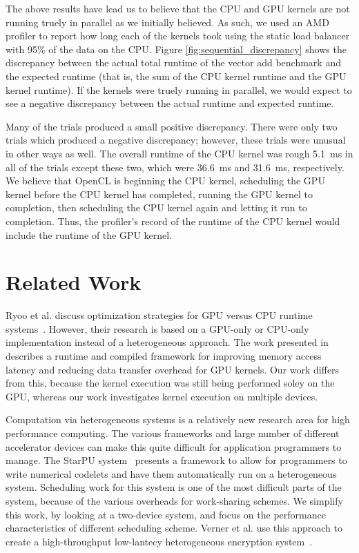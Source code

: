\documentclass[journal]{IEEEtran}
\begin{document}
The above results have lead us to believe that the CPU and GPU kernels are
not running truely in parallel as we initially believed.  As such, we used
an AMD profiler to report how long each of the kernels took using the static
load balancer with 95\% of the data on the CPU.  Figure \ref{fig:sequential_discrepancy}
shows the discrepancy between the actual total runtime of the vector add
benchmark and the expected runtime (that is, the sum of the CPU kernel runtime
and the GPU kernel runtime).  If the kernels were truely running in parallel,
we would expect to see a negative discrepancy between the actual runtime and
expected runtime.

Many of the trials produced a small positive discrepancy.  There were only
two trials which produced a negative discrepancy; however, these trials
were unusual in other ways as well.  The overall runtime of the CPU kernel
was rough 5.1~ms in all of the trials except these two, which were 36.6~ms
and 31.6~ms, respectively.  We believe that OpenCL is beginning the CPU
kernel, scheduling the GPU kernel before the CPU kernel has completed,
running the GPU kernel to completion, then scheduling the CPU kernel again
and letting it run to completion.  Thus, the profiler's record of the runtime
of the CPU kernel would include the runtime of the GPU kernel.

\section{Related Work}
Ryoo et al. discuss optimization strategies for GPU versus CPU runtime
systems~\cite{Ryoo2007}.  However, their research is based on a GPU-only
or CPU-only implementation instead of a heterogeneous approach.  The work
presented in ~\cite{Jablin2011} describes a runtime and compiled framework
for improving memory access latency and reducing data transfer overhead
for GPU kernels.  Our work differs from this, because the kernel execution
was still being performed soley on the GPU, whereas our work investigates
kernel execution on multiple devices.

Computation via heterogeneous systems is a relatively new research area for
high performance computing.  The various frameworks and large number of
different accelerator devices can make this quite difficult for application
programmers to manage.  The StarPU system~\cite{Augonnet2009} presents a 
framework to allow for programmers to write numerical codelets and have them
automatically run on a heterogeneous system.  Scheduling work for this system
is one of the most difficult parts of the system, because of the various
overheads for work-sharing schemes. We simplify this work, by looking at a
two-device system, and focus on the performance characteristics of different
scheduling scheme.  Verner et al. use this approach to create a high-throughput
low-lantecy heterogeneous encryption system~\cite{Verner2011}. 
\end{document}
